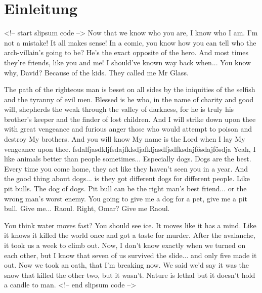 \chapter{Einleitung}

<!-- start slipsum code -->
Now that we know who you are, I know who I am. I'm not a mistake! It all makes sense! In a comic, you know how you can tell who the arch-villain's going to be? He's the exact opposite of the hero. And most times they're friends, like you and me! I should've known way back when... You know why, David? Because of the kids. They called me Mr Glass.

The path of the righteous man is beset on all sides by the iniquities of the selfish and the tyranny of evil men. Blessed is he who, in the name of charity and good will, shepherds the weak through the valley of darkness, for he is truly his brother's keeper and the finder of lost children. And I will strike down upon thee with great vengeance and furious anger those who would attempt to poison and destroy My brothers. And you will know My name is the Lord when I lay My vengeance upon thee.
fsdalfjasdkljfsdajfklsdjafkljasdfjsdfksdajfösdajfösdja
Yeah, I like animals better than people sometimes... Especially dogs. Dogs are the best. Every time you come home, they act like they haven't seen you in a year. And the good thing about dogs... is they got different dogs for different people. Like pit bulls. The dog of dogs. Pit bull can be the right man's best friend... or the wrong man's worst enemy. You going to give me a dog for a pet, give me a pit bull. Give me... Raoul. Right, Omar? Give me Raoul.


You think water moves fast? You should see ice. It moves like it has a mind. Like it knows it killed the world once and got a taste for murder. After the avalanche, it took us a week to climb out. Now, I don't know exactly when we turned on each other, but I know that seven of us survived the slide... and only five made it out. Now we took an oath, that I'm breaking now. We said we'd say it was the snow that killed the other two, but it wasn't. Nature is lethal but it doesn't hold a candle to man.
<!-- end slipsum code -->